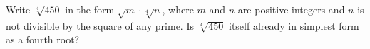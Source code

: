 Write $\sqrt[4]{450}$ in the form $\sqrt m\cdot\sqrt[4]{n}$, where $m$ and $n$ are positive integers and $n$ is not divisible by the square of any prime. Is $\sqrt[4]{450}$ itself already in simplest form as a fourth root?
